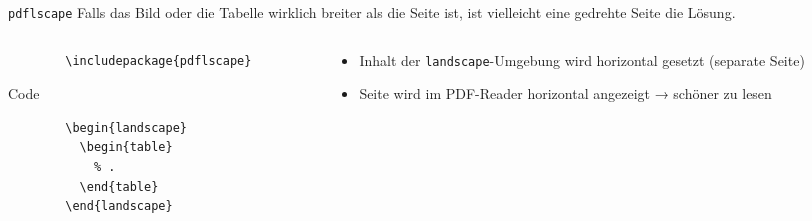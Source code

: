 \begin{frame}[fragile]{\texttt{pdflscape}}
  Falls das Bild oder die Tabelle wirklich breiter als die Seite ist, ist vielleicht eine gedrehte Seite die Lösung.
  \begin{columns}[onlytextwidth, t]
    \begin{column}{0.50\textwidth}
      \begin{Packages}
        \begin{lstlisting}
        \includepackage{pdflscape}
        \end{lstlisting}
      \end{Packages}
      \begin{block}{Code}
        \begin{lstlisting}
        \begin{landscape}
          \begin{table}
            % .
          \end{table}
        \end{landscape}
        \end{lstlisting}
      \end{block}
    \end{column}
    \begin{column}{0.46\textwidth}
      \begin{itemize}
        \item Inhalt der \texttt{landscape}-Umgebung wird horizontal gesetzt (separate Seite)
        \item Seite wird im PDF-Reader horizontal angezeigt → schöner zu lesen
      \end{itemize}
    \end{column}
  \end{columns}
\end{frame}

